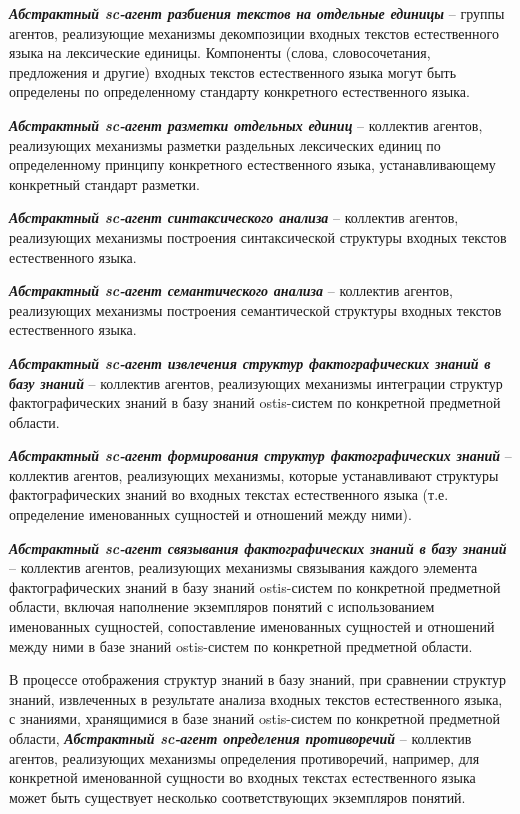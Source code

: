 \textit{\textbf{Абстрактный sc-агент разбиения текстов на отдельные единицы}} -- группы агентов, реализующие механизмы декомпозиции входных текстов естественного языка на лексические единицы. Компоненты (слова, словосочетания, предложения и другие) входных текстов естественного языка могут быть определены по определенному стандарту конкретного естественного языка.

\textit{\textbf{Абстрактный sc-агент разметки отдельных единиц}} -- коллектив агентов, реализующих механизмы разметки раздельных лексических единиц по определенному принципу конкретного естественного языка, устанавливающему конкретный стандарт разметки. 

\textit{\textbf{Абстрактный sc-агент синтаксического анализа}} -- коллектив агентов, реализующих механизмы построения синтаксической структуры входных текстов естественного языка.

\textit{\textbf{Абстрактный sc-агент семантического анализа}} -- коллектив агентов, реализующих механизмы построения семантической структуры входных текстов естественного языка.

\textit{\textbf{Абстрактный sc-агент извлечения структур фактографических знаний в базу знаний}} -- коллектив агентов, реализующих механизмы интеграции структур фактографических знаний в базу знаний ostis-систем по конкретной предметной области.

\textit{\textbf{Абстрактный sc-агент формирования структур фактографических знаний}} -- коллектив агентов, реализующих механизмы, которые устанавливают структуры фактографических знаний во входных текстах естественного языка (т.е. определение именованных сущностей и отношений между ними).

\textit{\textbf{Абстрактный sc-агент связывания фактографических знаний в базу знаний}} -- коллектив агентов, реализующих механизмы связывания каждого элемента фактографических знаний в базу знаний ostis-систем по конкретной предметной области, включая наполнение экземпляров понятий с использованием именованных сущностей, сопоставление именованных сущностей и отношений между ними в базе знаний ostis-систем по конкретной предметной области.

В процессе отображения структур знаний в базу знаний, при сравнении структур знаний, извлеченных в результате анализа входных текстов естественного языка, с знаниями, хранящимися в базе знаний ostis-систем по конкретной предметной области, \textit{\textbf{Абстрактный sc-агент определения противоречий}} -- коллектив агентов, реализующих механизмы определения противоречий, например, для конкретной именованной сущности во входных текстах естественного языка может быть существует несколько соответствующих экземпляров понятий. 

